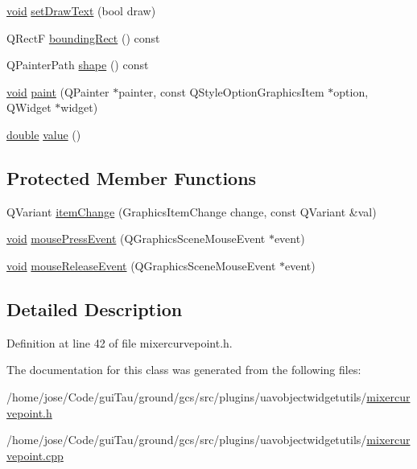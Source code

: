 \begin{DoxyCompactItemize}
\item 
\hyperlink{group___u_a_v_objects_plugin_ga444cf2ff3f0ecbe028adce838d373f5c}{void} \hyperlink{group___u_a_v_object_widget_utils_gac7a63c8df4268991b6c48f6d528fe02c}{set\-Draw\-Text} (bool draw)
\item 
Q\-Rect\-F \hyperlink{group___u_a_v_object_widget_utils_ga016954be92f06c8ef2007526890e030e}{bounding\-Rect} () const 
\item 
Q\-Painter\-Path \hyperlink{group___u_a_v_object_widget_utils_gafbd32275c2089c42d00f43a0e17886ae}{shape} () const 
\item 
\hyperlink{group___u_a_v_objects_plugin_ga444cf2ff3f0ecbe028adce838d373f5c}{void} \hyperlink{group___u_a_v_object_widget_utils_gaa06d538612911f733082849ebbef3cb0}{paint} (Q\-Painter $\ast$painter, const Q\-Style\-Option\-Graphics\-Item $\ast$option, Q\-Widget $\ast$widget)
\item 
\hyperlink{_super_l_u_support_8h_a8956b2b9f49bf918deed98379d159ca7}{double} \hyperlink{group___u_a_v_object_widget_utils_ga74c57bb80930c775e055d2759acb92fe}{value} ()
\end{DoxyCompactItemize}
\subsection*{Protected Member Functions}
\begin{DoxyCompactItemize}
\item 
Q\-Variant \hyperlink{group___u_a_v_object_widget_utils_ga4e95b04348d98dedd3493d466fb5bdf5}{item\-Change} (Graphics\-Item\-Change change, const Q\-Variant \&val)
\item 
\hyperlink{group___u_a_v_objects_plugin_ga444cf2ff3f0ecbe028adce838d373f5c}{void} \hyperlink{group___u_a_v_object_widget_utils_ga5b8710657e58b224928419c431d19fbc}{mouse\-Press\-Event} (Q\-Graphics\-Scene\-Mouse\-Event $\ast$event)
\item 
\hyperlink{group___u_a_v_objects_plugin_ga444cf2ff3f0ecbe028adce838d373f5c}{void} \hyperlink{group___u_a_v_object_widget_utils_ga82dc38bf127547b87931a58561f02a27}{mouse\-Release\-Event} (Q\-Graphics\-Scene\-Mouse\-Event $\ast$event)
\end{DoxyCompactItemize}


\subsection{Detailed Description}


Definition at line 42 of file mixercurvepoint.\-h.



The documentation for this class was generated from the following files\-:\begin{DoxyCompactItemize}
\item 
/home/jose/\-Code/gui\-Tau/ground/gcs/src/plugins/uavobjectwidgetutils/\hyperlink{mixercurvepoint_8h}{mixercurvepoint.\-h}\item 
/home/jose/\-Code/gui\-Tau/ground/gcs/src/plugins/uavobjectwidgetutils/\hyperlink{mixercurvepoint_8cpp}{mixercurvepoint.\-cpp}\end{DoxyCompactItemize}
